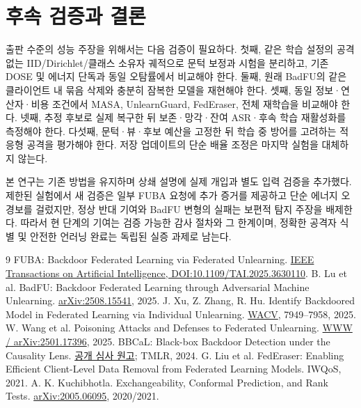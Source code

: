 \documentclass[10pt,a4paper]{article}
\begin{document}
\section{후속 검증과 결론}
출판 수준의 성능 주장을 위해서는 다음 검증이 필요하다.
첫째, 같은 학습 설정의 공격 없는 IID/Dirichlet/클래스 소유자 궤적으로
문턱 보정과 시험을 분리하고, 기존 DOSE 및 에너지 단독과 동일 오탐률에서 비교해야 한다.
둘째, 원래 BadFU의 같은 클라이언트 내 묶음 삭제와 충분히 잠복한 모델을 재현해야 한다.
셋째, 동일 정보·연산자·비용 조건에서 MASA, UnlearnGuard, FedEraser, 전체 재학습을 비교해야 한다.
넷째, 추정 후보로 실제 복구한 뒤 보존·망각·잔여 ASR·후속 학습 재활성화를 측정해야 한다.
다섯째, 문턱·뷰·후보 예산을 고정한 뒤 학습 중 방어를 고려하는 적응형 공격을 평가해야 한다.
저장 업데이트의 단순 배율 조정은 마지막 실험을 대체하지 않는다.

본 연구는 기존 방법을 유지하며 상쇄 설명에 실제 개입과 별도 입력 검증을 추가했다.
제한된 실험에서 새 검증은 일부 FUBA 요청에 추가 증거를 제공하고 단순 에너지 오경보를 걸렀지만,
정상 반대 기여와 BadFU 변형의 실패는 보편적 탐지 주장을 배제한다.
따라서 현 단계의 기여는 검증 가능한 감사 절차와 그 한계이며,
정확한 공격자 식별 및 안전한 언러닝 완료는 독립된 실증 과제로 남는다.

\begin{thebibliography}{9}
 FUBA: Backdoor Federated Learning via Federated Unlearning.
\href{https://ieeexplore.ieee.org/document/11231135/}{IEEE Transactions on Artificial Intelligence, DOI:10.1109/TAI.2025.3630110}.
 B. Lu et al. BadFU: Backdoor Federated Learning through Adversarial Machine Unlearning.
\href{https://arxiv.org/abs/2508.15541}{arXiv:2508.15541}, 2025.
 J. Xu, Z. Zhang, R. Hu. Identify Backdoored Model in Federated Learning via Individual Unlearning.
\href{https://openaccess.thecvf.com/content/WACV2025/html/Xu_Identify_Backdoored_Model_in_Federated_Learning_via_Individual_Unlearning_WACV_2025_paper.html}{WACV}, 7949--7958, 2025.
 W. Wang et al. Poisoning Attacks and Defenses to Federated Unlearning.
\href{https://arxiv.org/abs/2501.17396}{WWW / arXiv:2501.17396}, 2025.
 BBCaL: Black-box Backdoor Detection under the Causality Lens.
\href{https://openreview.net/notes/edits/attachment?id=cJ3e8RwIZu\&name=pdf}{공개 심사 원고}; TMLR, 2024.
 G. Liu et al. FedEraser: Enabling Efficient Client-Level Data Removal from Federated Learning Models. IWQoS, 2021.
 A. K. Kuchibhotla. Exchangeability, Conformal Prediction, and Rank Tests.
\href{https://arxiv.org/abs/2005.06095}{arXiv:2005.06095}, 2020/2021.
\end{thebibliography}
\end{document}
